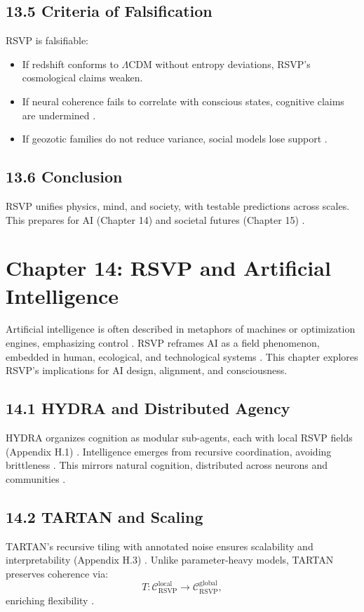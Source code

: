 \documentclass[12pt]{article}
\begin{document}
\subsection*{13.5 Criteria of Falsification}
RSVP is falsifiable:
\begin{itemize}
    \item If redshift conforms to \(\Lambda\)CDM without entropy deviations, RSVP's cosmological claims weaken.
    \item If neural coherence fails to correlate with conscious states, cognitive claims are undermined \citep{tononi2004}.
    \item If geozotic families do not reduce variance, social models lose support \citep{hanson2003}.
\end{itemize}
\subsection*{13.6 Conclusion}
RSVP unifies physics, mind, and society, with testable predictions across scales. This prepares for AI (Chapter 14) and societal futures (Chapter 15) \citep{whitehead1978}.
\section*{Chapter 14: RSVP and Artificial Intelligence}
Artificial intelligence is often described in metaphors of machines or optimization engines, emphasizing control \citep{friston2010}. RSVP reframes AI as a field phenomenon, embedded in human, ecological, and technological systems \citep{whitehead1978}. This chapter explores RSVP's implications for AI design, alignment, and consciousness.
\subsection*{14.1 HYDRA and Distributed Agency}
HYDRA organizes cognition as modular sub-agents, each with local RSVP fields (Appendix H.1) \citep{bird1988}. Intelligence emerges from recursive coordination, avoiding brittleness \citep{pearl2009}. This mirrors natural cognition, distributed across neurons and communities \citep{hohwy2013}.
\subsection*{14.2 TARTAN and Scaling}
TARTAN's recursive tiling with annotated noise ensures scalability and interpretability (Appendix H.3) \citep{milewski2018}. Unlike parameter-heavy models, TARTAN preserves coherence via:
\[
T: \mathcal{C}_{\text{RSVP}}^{\text{local}} \to \mathcal{C}_{\text{RSVP}}^{\text{global}},
\]
enriching flexibility \citep{lawvere2009}.
\end{document}
